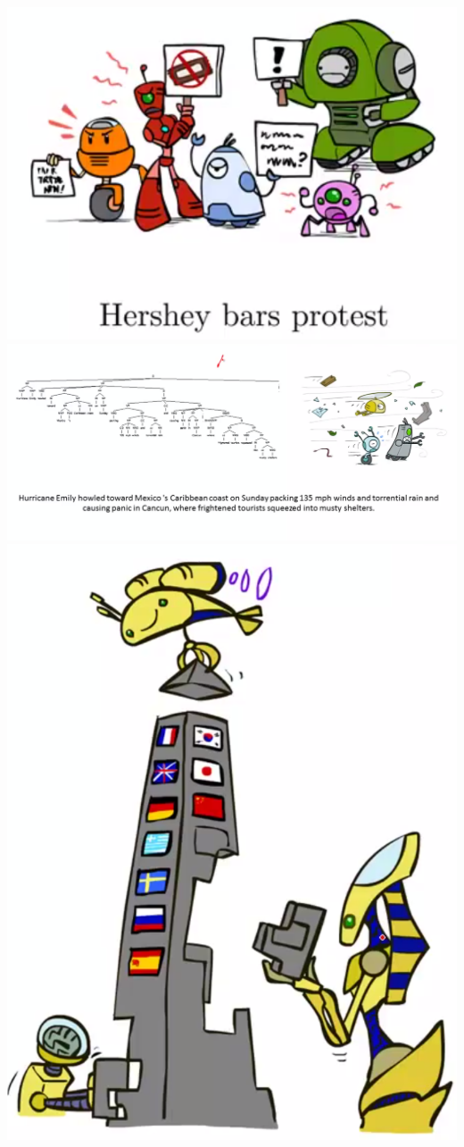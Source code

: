 \documentclass[twocolumn]{article}
\begin{document}
{\includegraphics[scale=0.5]{snapshot162}\\
\includegraphics[scale=0.35]{snapshot163}\\
\includegraphics[scale=0.5]{snapshot164}\\
}
\end{document}
